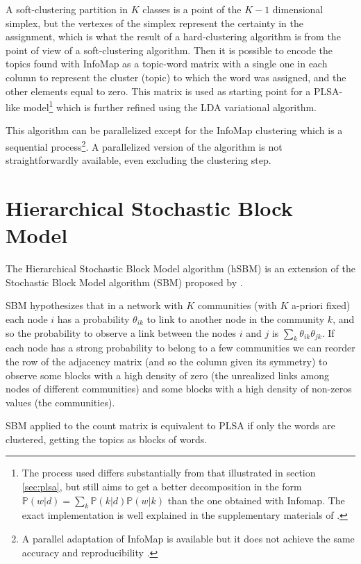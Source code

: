 \documentclass[11pt, a4paper, oneside, openright]{book}
\begin{document}
A soft-clustering partition in $K$ classes is a point of the $K-1$ dimensional simplex, but the vertexes of the simplex represent the certainty in the assignment, which is what the result of a hard-clustering algorithm is from the point of view of a soft-clustering algorithm. Then it is possible to encode the topics found with InfoMap as a topic-word matrix with a single one in each column to represent the cluster (topic) to which the word was assigned, and the other elements equal to zero. This matrix is used as starting point for a PLSA-like model\footnote{The process used differs substantially from that illustrated in section \ref{sec:plsa}, but still aims to get a better decomposition in the form $\mathbb{P}(w|d) = \sum_k \mathbb{P}(k|d) \mathbb{P}(w|k)$ than the one obtained with Infomap. The exact implementation is well explained in the supplementary materials of \textcite{lancichinetti2015}.} which is further refined using the LDA variational algorithm.

This algorithm can be parallelized except for the InfoMap clustering which is a sequential process\footnote{A parallel adaptation of InfoMap is available but it does not achieve the same accuracy and reproducibility \parencite{zeng2018}.}. A parallelized version of the algorithm is not straightforwardly available, even excluding the clustering step.

\section{Hierarchical Stochastic Block Model}
\label{sec:hsbm}
The Hierarchical Stochastic Block Model algorithm (hSBM) \parencite{gerlach2018} is an extension of the Stochastic Block Model algorithm (SBM) proposed by \textcite{ball2011}. 

SBM hypothesizes that in a network with $K$ communities (with $K$ a-priori fixed) each node $i$ has a probability $\theta_{ik}$ to link to another node in the community $k$, and so the probability to observe a link between the nodes $i$ and $j$ is $\sum_k \theta_{ik} \theta_{jk}$. If each node has a strong probability to belong to a few communities we can reorder the row of the adjacency matrix (and so the column given its symmetry) to observe some blocks with a high density of zero (the unrealized links among nodes of different communities) and some blocks with a high density of non-zeros values (the communities).

SBM applied to the count matrix is equivalent to PLSA \parencite{gerlach2018} if only the words are clustered, getting the topics as blocks of words.
\end{document}
